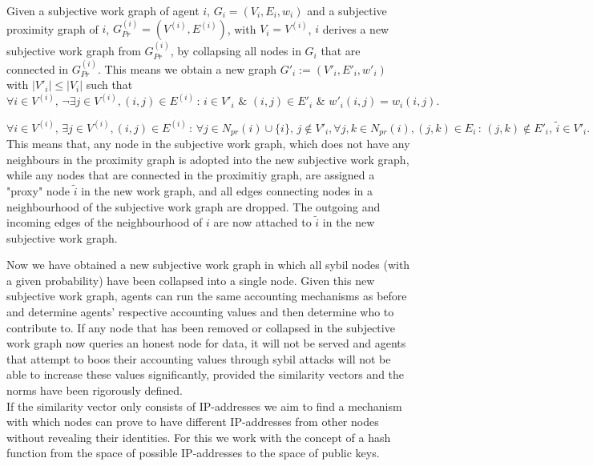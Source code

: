 \begin{definition}
Given a subjective work graph of agent $i$, $G_i=(V_i,E_i,w_i)$ and a subjective proximity graph of $i$, $G^{(i)}_{Pr}=(V^{(i)}, E^{(i)})$, with $V_i=V^{(i)}$, $i$ derives a new subjective work graph from $G^{(i)}_{Pr}$, by collapsing all nodes in $G_i$ that are connected in $G^{(i)}_{Pr}$. This means we obtain a new graph $G'_i:=(V'_i, E'_i, w'_i)$ with $|V'_i|\leq{}|V_i|$ such that
\[
\forall{}i\in{}V^{(i)},\,\neg\exists{}j\in{}V^{(i)},(i,j)\in{}E^{(i)}\,:\,i\in{}V'_i\,\,\&\,\,(i,j)\in{}E'_i\,\,\&\,\,w'_i(i,j)=w_i(i,j) .
\]

\[
\forall{}i\in{}V^{(i)},\,\exists{}j\in{}V^{(i)},(i,j)\in{}E^{(i)}\,:\,\forall{}j\in{}N_{pr}(i)\cup{}\lbrace{}i\rbrace,\,j\not\in{}V'_i,\forall{}j,k\in{}N_{pr}(i), (j,k)\in{}E_i\,:\,(j,k)\not\in{}E'_i,\,\tilde{i}\in{}V'_i.
\]
This means that, any node in the subjective work graph, which does not have any neighbours in the proximity graph is adopted into the new subjective work graph, while any nodes that are connected in the proximitiy graph, are assigned a "proxy" node $\tilde{i}$ in the new work graph, and all edges connecting nodes in a neighbourhood of the subjective work graph are dropped. The outgoing and incoming edges of the neighbourhood of $i$ are now attached to $\tilde{i}$ in the new subjective work graph. \vspace{1em}\\
\end{definition}

\noindent{}Now we have obtained a new subjective work graph in which all sybil nodes (with a given probability) have been collapsed into a single node. Given this new subjective work graph, agents can run the same accounting mechanisms as before and determine agents' respective accounting values and then determine who to contribute to. If any node that has been removed or collapsed in the subjective work graph now queries an honest node for data, it will not be served and agents that attempt to boos their accounting values through sybil attacks will not be able to increase these values significantly, provided the similarity vectors and the norms have been rigorously defined.\vspace{1em}\\

\noindent{}If the similarity vector only consists of IP-addresses we aim to find a mechanism with which nodes can prove to have different IP-addresses from other nodes without revealing their identities. For this we work with the concept of a hash function from the space of possible IP-addresses to the space of public keys.

